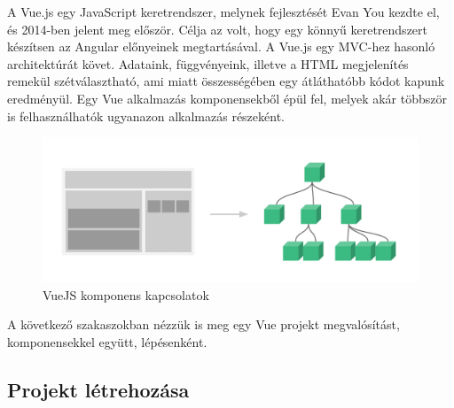

A Vue.js egy JavaScript keretrendszer, melynek fejlesztését Evan You kezdte el, és 2014-ben jelent meg először. Célja az volt, hogy egy könnyű keretrendszert készítsen az Angular előnyeinek megtartásával. A Vue.js egy MVC-hez hasonló architektúrát követ. Adataink, függvényeink, illetve a HTML megjelenítés remekül szétválasztható, ami miatt összességében egy átláthatóbb kódot kapunk eredményül. Egy Vue alkalmazás komponensekből épül fel, melyek akár többször is felhasználhatók ugyanazon alkalmazás részeként.

\begin{figure}[h!]
\centering
\includegraphics[scale=0.25]{images/components.png}
\caption{VueJS komponens kapcsolatok}
\label{fig:ff}
\end{figure}

A következő szakaszokban nézzük is meg egy Vue projekt megvalósítást, komponensekkel együtt, lépésenként.

\subsection{Projekt létrehozása}

